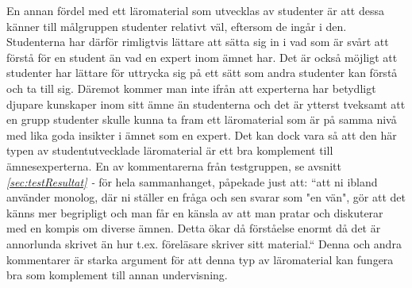 \documentclass[12pt,a4paper,twoside,openright]{article}
\begin{document}
En annan fördel med ett läromaterial som utvecklas av studenter
är att dessa känner till målgruppen studenter relativt väl,
eftersom de ingår i den. Studenterna har därför rimligtvis lättare
att sätta sig in i vad som är svårt att förstå för en student
än vad en expert inom ämnet har. Det är också möjligt att studenter
har lättare för uttrycka sig på ett sätt som andra studenter
kan förstå och ta till sig. Däremot kommer man inte ifrån
att experterna har betydligt djupare kunskaper inom sitt ämne
än studenterna och det är ytterst tveksamt att en grupp studenter
skulle kunna ta fram ett läromaterial som är på samma nivå med
lika goda insikter i ämnet som en expert. Det kan dock vara så
att den här typen av studentutvecklade läromaterial är ett bra
komplement till ämnesexperterna. En av kommentarerna från
testgruppen, se avsnitt \textit{\ref{sec:testResultat} - } för hela sammanhanget,
påpekade just att: “att ni ibland använder monolog, där ni
ställer en fråga och sen svarar som "en vän", gör
att det känns mer begripligt och man får en känsla av att man
pratar och diskuterar med en kompis om diverse ämnen. Detta
ökar då förståelse enormt då det är annorlunda skrivet än hur
t.ex. föreläsare skriver sitt material.“ Denna och andra
kommentarer är starka argument för att denna typ av
läromaterial kan fungera bra som komplement till annan
undervisning.


\end{document}
